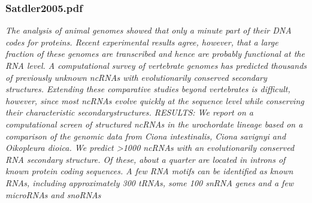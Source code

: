 \subsubsection{Satdler2005.pdf}
\cite{Missal2005} 
\textit{The analysis of animal genomes showed that only a minute part of their DNA codes for proteins. Recent experimental results agree, however, that a large fraction of these genomes are transcribed and hence are probably functional at the RNA level. A computational survey of vertebrate genomes has predicted thousands of previously unknown ncRNAs with evolutionarily conserved secondary structures. Extending these comparative studies beyond vertebrates is difficult, however, since most ncRNAs evolve quickly at the sequence level while conserving their characteristic secondarystructures. RESULTS: We report on a computational screen of structured ncRNAs in the urochordate lineage based on a comparison of the genomic data from Ciona intestinalis, Ciona savignyi and Oikopleura dioica. We predict {\textgreater}1000 ncRNAs with an evolutionarily conserved RNA secondary structure. Of these, about a quarter are located in introns of known protein coding sequences. A few RNA motifs can be identified as known RNAs, including approximately 300 tRNAs, some 100 snRNA genes and a few microRNAs and snoRNAs}

